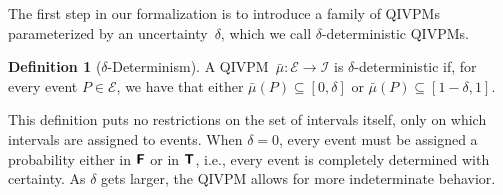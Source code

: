 \documentclass[english,reprint, aps, prl,superscriptaddress, showpacs,
showkeys, longbibliography, amsmath, amssymb, floatfix]{revtex4-1}
\theoremstyle{plain}
\theoremstyle{definition}
\newtheorem{definition}{Definition}
\newcommand{\events}{\ensuremath{\mathcal{E}}}
\newcommand{\imposs}{\textbf{\textsf{F}}}
\newcommand{\necess}{\textbf{\textsf{T}}}
\newcommand{\unknown}{\textbf{\textsf{U}}}
\newcommand{\proj}[1]{\op{#1}{#1}}
\newcommand{\says}[3]{\begin{framed}\begin{minipage}{0.9\linewidth}\color{#1}{#2 says: #3}\end{minipage}\end{framed}}
\newcommand{\yutsung}[1]{\says{purple}{Yu-Tsung}{#1}}
\begin{document}
The first step in our formalization is to introduce a family of QIVPMs
parameterized by an uncertainty~$\delta$, which we call
$\delta$-deterministic QIVPMs.

\begin{definition}[$\delta$-Determinism]\label{def:delta-deterministic} A
  QIVPM~$\bar{\mu}:\events\rightarrow\mathscr{I}$ is
  $\delta$-deterministic if, for every event $P\in\events$, we have
  that either 
  $\bar{\mu}\left(P\right)\subseteq\left[0,\delta\right]$ or
  $\bar{\mu}\left(P\right)\subseteq\left[1-\delta,1\right]$. 
\end{definition}


\noindent This definition puts no restrictions on the set of intervals
itself, only on which intervals are assigned to events. When
$\delta=0$, every event must be assigned a probability either in
$\imposs$ or in $\necess$, i.e., every event is completely determined
with certainty. As $\delta$ gets larger, the QIVPM allows for more
indeterminate behavior. %
\end{document}
